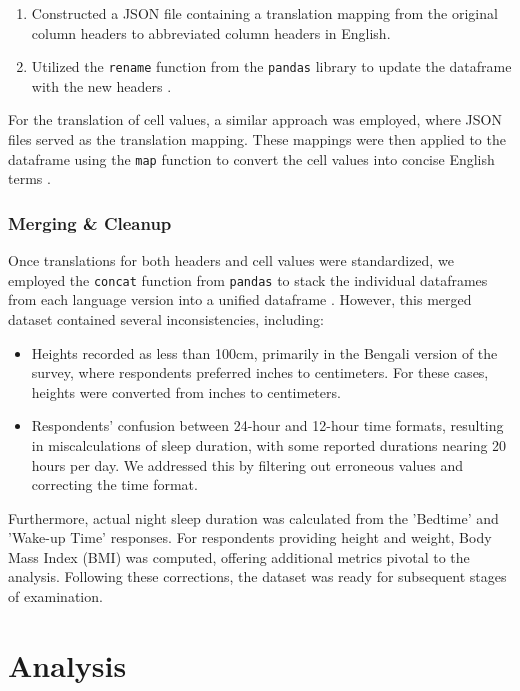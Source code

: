 \documentclass[conference]{IEEEtran}
\begin{document}
\begin{enumerate}
    \item Constructed a JSON file containing a translation mapping from the original column headers to abbreviated column headers in English.
    \item Utilized the \texttt{rename} function from the \texttt{pandas} library to update the dataframe with the new headers \cite{dfrename}.
\end{enumerate}

For the translation of cell values, a similar approach was employed, where JSON files served as the translation mapping. These mappings were then applied to the dataframe using the \texttt{map} function to convert the cell values into concise English terms \cite{dfmap}.

\subsubsection*{Merging \& Cleanup}
Once translations for both headers and cell values were standardized, we employed the \texttt{concat} function from \texttt{pandas} to stack the individual dataframes from each language version into a unified dataframe \cite{pdconcat}. However, this merged dataset contained several inconsistencies, including:

\begin{itemize}
    \item Heights recorded as less than 100cm, primarily in the Bengali version of the survey, where respondents preferred inches to centimeters. For these cases, heights were converted from inches to centimeters.
    \item Respondents' confusion between 24-hour and 12-hour time formats, resulting in miscalculations of sleep duration, with some reported durations nearing 20 hours per day. We addressed this by filtering out erroneous values and correcting the time format.
\end{itemize}
Furthermore, actual night sleep duration was calculated from the 'Bedtime' and 'Wake-up Time' responses. For respondents providing height and weight, Body Mass Index (BMI) was computed, offering additional metrics pivotal to the analysis. Following these corrections, the dataset was ready for subsequent stages of examination.
\section{Analysis}
\end{document}
